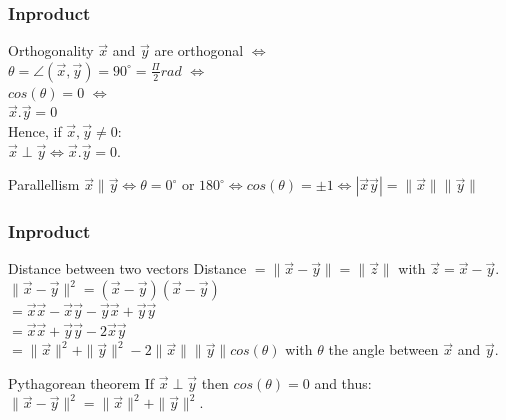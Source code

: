 \begin{frame}
	\frametitle{Inproduct}
	\begin{block}{Orthogonality}
		$\overrightarrow{x}$ and $\overrightarrow{y}$ are orthogonal $\Leftrightarrow$\\ $\theta=\angle(\overrightarrow{x},\overrightarrow{y})=90^{\circ}=\frac{\Pi}{2} rad$ $\Leftrightarrow$\\
		$cos(\theta)=0$ $\Leftrightarrow$\\
		$\overrightarrow{x}.\overrightarrow{y}=0$\\
		\vspace{5mm}
		Hence, if $\overrightarrow{x},\overrightarrow{y} \neq 0$:\\
		$\overrightarrow{x}\perp\overrightarrow{y} \Leftrightarrow \overrightarrow{x}.\overrightarrow{y}=0$.
	\end{block} 
	\begin{block}{Parallellism}
		$\overrightarrow{x}\parallel\overrightarrow{y}\Leftrightarrow
		\theta=0^{\circ}$ or $180^{\circ} \Leftrightarrow
		cos(\theta)=\pm 1 \Leftrightarrow
		|\overrightarrow{x}\overrightarrow{y}|=\|\overrightarrow{x}\|\|\overrightarrow{y}\|$
	\end{block} 
\end{frame}

\begin{frame}
	\frametitle{Inproduct}
	\begin{block}{Distance between two vectors}
		Distance $=\|\overrightarrow{x}-\overrightarrow{y}\|=\|\overrightarrow{z}\|$ with $\overrightarrow{z}=\overrightarrow{x}-\overrightarrow{y}$.\\
		$\|\overrightarrow{x}-\overrightarrow{y}\|^2=(\overrightarrow{x}-\overrightarrow{y}) (\overrightarrow{x}-\overrightarrow{y})$ \\
		$=\overrightarrow{x}\overrightarrow{x}-\overrightarrow{x}\overrightarrow{y}-\overrightarrow{y}\overrightarrow{x}+\overrightarrow{y}\overrightarrow{y}$ \\ 
		$=\overrightarrow{x}\overrightarrow{x}+\overrightarrow{y}\overrightarrow{y}-2\overrightarrow{x}\overrightarrow{y}$ \\
		$=\|\overrightarrow{x}\|^2+\|\overrightarrow{y}\|^2-2\|\overrightarrow{x}\|\|\overrightarrow{y}\|cos(\theta)$ with $\theta$ the angle between $\overrightarrow{x}$ and $\overrightarrow{y}$.
	\end{block}
	\begin{block}{Pythagorean theorem}
		If $\overrightarrow{x}\perp\overrightarrow{y}$ then $cos(\theta)=0$ and thus:\\
		$\|\overrightarrow{x}-\overrightarrow{y}\|^2=\|\overrightarrow{x}\|^2+\|\overrightarrow{y}\|^2$.
	\end{block} 
\end{frame}

